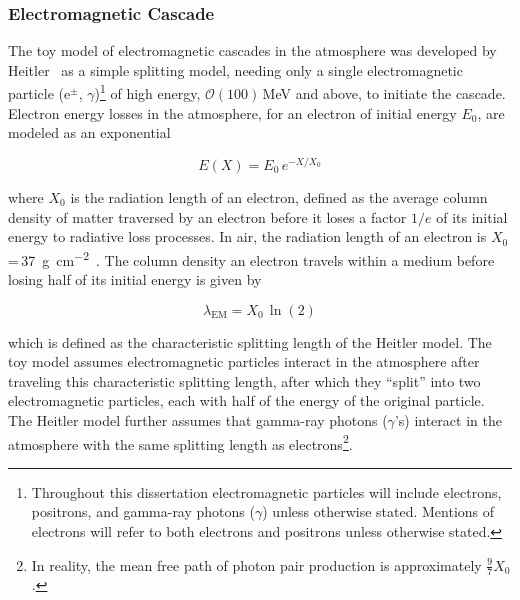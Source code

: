 
\subsubsection{Electromagnetic Cascade}\label{sssec:electromagnetic}
The toy model of electromagnetic cascades in the atmosphere was developed by Heitler~\cite{heitler_book} as a simple splitting model, needing only a single electromagnetic particle ($\text{e}^{\pm}$, $\gamma$)\footnote[3]{Throughout this dissertation electromagnetic particles will include electrons, positrons, and gamma-ray photons ($\gamma$) unless otherwise stated. Mentions of electrons will refer to both electrons and positrons unless otherwise stated.} of high energy, $\mathcal{O}(100)$\,MeV and above, to initiate the cascade.
Electron energy losses in the atmosphere, for an electron of initial energy $E_{0}$, are modeled as an exponential 

\begin{equation}
    E\left(X\right) = E_{0}\,e^{-X / X_{0}} \label{eq:electron_energy_loss}
\end{equation}

\noindent
where $X_{0}$ is the radiation length of an electron, defined as the average column density of matter traversed by an electron before it loses a factor $1/e$ of its initial energy to radiative loss processes.
In air, the radiation length of an electron is $X_{0}$\,=\,\qty{37}{\gram\per\centi\meter\squared}~\cite{tom_book}.
The column density an electron travels within a medium before losing half of its initial energy is given by

\begin{equation}
    \lambda_{\text{EM}} = X_{0}\,\ln\left(2\right) \label{eq:splitting_length}
\end{equation}

\noindent
which is defined as the characteristic splitting length of the Heitler model.
The toy model assumes electromagnetic particles interact in the atmosphere after traveling this characteristic splitting length, after which they ``split'' into two electromagnetic particles, each with half of the energy of the original particle.
The Heitler model further assumes that gamma-ray photons ($\gamma$'s) interact in the atmosphere with the same splitting length as electrons\footnote[4]{In reality, the mean free path of photon pair production is approximately $\frac{9}{7}X_{0}$.}.

